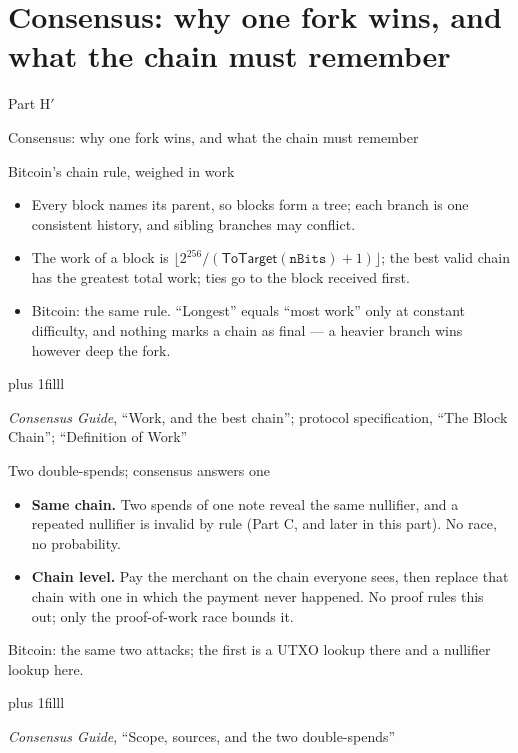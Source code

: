 \documentclass[aspectratio=169,11pt]{beamer}
\newcommand{\divider}[2]{%
  \section{#2}
  \begin{frame}[plain,t]
  \vspace*{14mm}
  {\small\color{arb}#1\par}
  \vskip8mm
  \begin{minipage}{0.88\textwidth}\raggedright
    \fontsize{27}{31}\selectfont #2\par
  \end{minipage}
  \end{frame}}
\newcommand{\src}[1]{\par\vskip0pt plus 1filll
  {\fontsize{6}{7.2}\selectfont\color{arbdim}\raggedright #1\par}}
\begin{document}
\divider{Part H$'$}{Consensus: why one fork wins, and what the chain must remember}

\begin{frame}{Bitcoin's chain rule, weighed in work}
\Ktree
\begin{itemize}
\item Every block names its parent, so blocks form a tree; each branch
  is one consistent history, and sibling branches may conflict.
\item The work of a block is
  $\lfloor 2^{256} / (\mathsf{ToTarget}(\mathtt{nBits}) + 1) \rfloor$;
  the best valid chain has the greatest total work; ties go to the
  block received first.
\item \alert{Bitcoin:} the same rule. ``Longest'' equals ``most work''
  only at constant difficulty, and nothing marks a chain as final --- a
  heavier branch wins however deep the fork.
\end{itemize}
\src{\emph{Consensus Guide}, ``Work, and the best chain''; protocol
  specification, ``The Block Chain''; ``Definition of Work''}
\end{frame}

\begin{frame}{Two double-spends; consensus answers one}
\begin{itemize}
\item \textbf{Same chain.} Two spends of one note reveal the same
  nullifier, and a repeated nullifier is invalid by rule (Part C, and
  later in this part). No race, no probability.
\item \textbf{Chain level.} Pay the merchant on the chain everyone
  sees, then replace that chain with one in which the payment never
  happened. No proof rules this out; only the proof-of-work race bounds
  it.
\end{itemize}
\medskip
\alert{Bitcoin:} the same two attacks; the first is a UTXO lookup there
and a nullifier lookup here.
\src{\emph{Consensus Guide}, ``Scope, sources, and the two
  double-spends''}
\end{frame}
\end{document}
